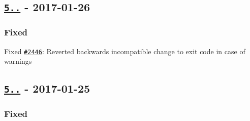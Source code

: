 \subsection*{\href{https://github.com/sebastianbergmann/phpunit/compare/5.7.7...5.7.8}{\tt 5..} -\/ 2017-\/01-\/26}

\subsubsection*{Fixed}


\begin{DoxyItemize}
\item Fixed \href{https://github.com/sebastianbergmann/phpunit/issues/2446}{\tt \#2446}\+: Reverted backwards incompatible change to exit code in case of warnings
\end{DoxyItemize}

\subsection*{\href{https://github.com/sebastianbergmann/phpunit/compare/5.7.6...5.7.7}{\tt 5..} -\/ 2017-\/01-\/25}

\subsubsection*{Fixed}



